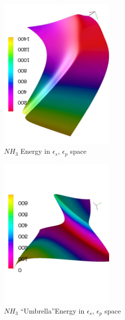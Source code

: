 %
\begin{figure}
\begin{center}
\includegraphics[width=0.5\textwidth,angle=-90]{figures/obj}
\caption{$NH_3$ Energy in $\epsilon_s$, $\epsilon_p$ space}
\label{spacenh3}
\end{center}
\end{figure}
%
\begin{figure}[!htb]
\begin{center}
\includegraphics[width=0.5\textwidth,angle=-90]{figures/umbobj}
\caption{$NH_3$ ``Umbrella''Energy in $\epsilon_s$, $\epsilon_p$ space}
\label{umbnh3}
\end{center}
\end{figure}
%
%
%
